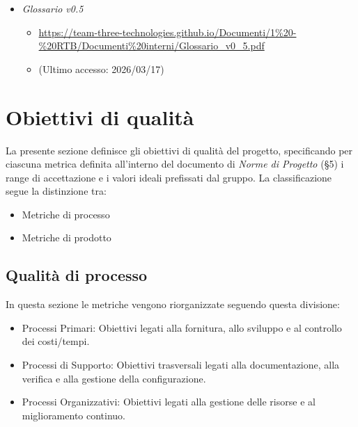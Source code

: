 \documentclass[a4paper,12pt]{article}
\begin{document}
{\begin{itemize}
                    \begin{itemize}
                        \item \url{https://www.math.unipd.it/~tullio/IS-1/2009/Approfondimenti/ISO_12207-1995.pdf}
                        \item[] (Ultimo accesso: 2026/02/03)
                    \end{itemize}
                    \item \textit{Glossario v0.5}
                    \begin{itemize}
                        \item \url{https://team-three-technologies.github.io/Documenti/1%20-%20RTB/Documenti%20interni/Glossario_v0_5.pdf}
                        \item[] (Ultimo accesso: 2026/03/17)
                    \end{itemize}
                \end{itemize}
    }

    \newpage

    \section{Obiettivi di qualità}
    La presente sezione definisce gli obiettivi di qualità del progetto, specificando per ciascuna metrica definita all'interno del documento di \textit{Norme di Progetto} (\S5) i range di accettazione e i valori ideali prefissati dal gruppo. La classificazione segue la distinzione tra:
    \begin{itemize}
        \item Metriche di processo
        \item Metriche di prodotto
    \end{itemize}
    
        \subsection{Qualità di processo}
            In questa sezione le metriche vengono riorganizzate seguendo questa divisione: 
            \begin{itemize}
                \item Processi Primari: Obiettivi legati alla fornitura, allo sviluppo e al controllo dei costi/tempi.
                \item Processi di Supporto: Obiettivi trasversali legati alla documentazione, alla verifica e alla gestione della configurazione.
                \item Processi Organizzativi: Obiettivi legati alla gestione delle risorse e al miglioramento continuo.
            \end{itemize}
            
\end{document}
